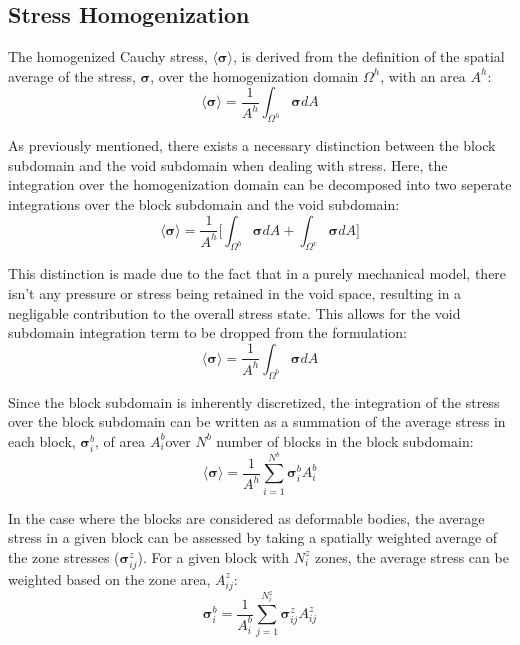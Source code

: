 \subsection{Stress Homogenization}

The homogenized Cauchy stress, $\langle\boldsymbol{\sigma}\rangle$,
is derived from the definition of the spatial average of the stress,
$\boldsymbol{\sigma}$, over the homogenization domain $\Omega^{h}$,
with an area $A^{h}$: 
\begin{equation}
\langle\boldsymbol{\sigma}\rangle=\frac{1}{A^{h}}\int_{\Omega^{h}}\boldsymbol{\sigma}{dA}\label{eqn:stress1}
\end{equation}


As previously mentioned, there exists a necessary distinction between
the block subdomain and the void subdomain when dealing with stress.
Here, the integration over the homogenization domain can be decomposed
into two seperate integrations over the block subdomain and the void
subdomain: 
\begin{equation}
\langle\boldsymbol{\sigma}\rangle=\frac{1}{A^{h}}\bigg\lbrack{\int_{\Omega^{b}}\boldsymbol{\sigma}{dA}+\int_{\Omega^{v}}\boldsymbol{\sigma}{dA}}\bigg\rbrack\label{eqn:stress2}
\end{equation}


This distinction is made due to the fact that in a purely mechanical
model, there isn't any pressure or stress being retained in the void
space, resulting in a negligable contribution to the overall stress
state. This allows for the void subdomain integration term to be dropped
from the formulation: 
\begin{equation}
\langle\boldsymbol{\sigma}\rangle=\frac{1}{A^{h}}\int_{\Omega^{b}}\boldsymbol{\sigma}{dA}\label{eqn:stress2a}
\end{equation}


Since the block subdomain is inherently discretized, the integration
of the stress over the block subdomain can be written as a summation
of the average stress in each block, $\boldsymbol{\sigma}_{i}^{b}$,
of area $A_{i}^{b}$over $N^{b}$ number of blocks in the block subdomain:
\begin{equation}
\langle\boldsymbol{\sigma}\rangle=\frac{1}{A^{h}}\sum_{i=1}^{N^{b}}\boldsymbol{\sigma}_{i}^{b}A_{i}^{b}\label{eqn:stress3}
\end{equation}


In the case where the blocks are considered as deformable bodies,
the average stress in a given block can be assessed by taking a spatially
weighted average of the zone stresses ($\boldsymbol{\sigma}_{ij}^{z}$).
For a given block with $N_{i}^{z}$ zones, the average stress can
be weighted based on the zone area, $A_{ij}^{z}$: 
\begin{equation}
\boldsymbol{\sigma}_{i}^{b}=\frac{1}{A_{i}^{b}}\sum_{j=1}^{N_{i}^{z}}\boldsymbol{\sigma}_{ij}^{z}A_{ij}^{z}\label{eqn:stress3a}
\end{equation}



